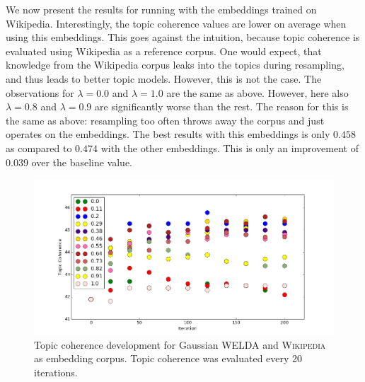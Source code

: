 \documentclass[
        a4paper,
        titlepage,
        twoside,
        parskip
        ]{scrbook}
\theoremstyle{break}
\begin{document}
We now present the results for running with the embeddings trained on Wikipedia.
Interestingly, the topic coherence values are lower on average when using this embeddings.
This goes against the intuition, because topic coherence is evaluated using Wikipedia as a reference corpus.
One would expect, that knowledge from the Wikipedia corpus leaks into the topics during resampling, and thus leads to better topic models.
However, this is not the case.
The observations for $\lambda = 0.0$ and $\lambda = 1.0$ are the same as above.
However, here also $\lambda = 0.8$ and $\lambda = 0.9$ are significantly worse than the rest.
The reason for this is the same as above: resampling too often throws away the corpus and just operates on the embeddings.
The best results with this embeddings is only $0.458$ as compared to $0.474$ with the other embeddings.
This is only an improvement of $0.039$ over the baseline value.

\begin{figure}
       \centering
       \includegraphics[width=\textwidth]{figures/welda_gaussian_lambda_200.png}
       \caption{Topic coherence development for Gaussian WELDA and \textsc{Wikipedia} as embedding corpus. Topic coherence was evaluated every 20 iterations.}
       \label{fig:welda_gaussian_lambda_200}
\end{figure}
\end{document}
